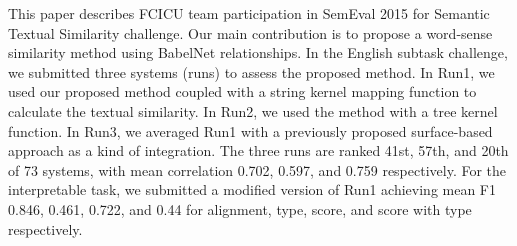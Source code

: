 This paper describes FCICU team participation in SemEval 2015 for Semantic Textual Similarity challenge. Our main contribution is to propose a word-sense similarity method using BabelNet relationships. In the English subtask challenge, we submitted three systems (runs) to assess the proposed method. In Run1, we used our proposed method coupled with a string kernel mapping function to calculate the textual similarity. In Run2, we used the method with a tree kernel function. In Run3, we averaged Run1 with a previously proposed surface-based approach as a kind of integration. The three runs are ranked 41st, 57th, and 20th of 73 systems, with mean correlation 0.702, 0.597, and 0.759 respectively. For the interpretable task, we submitted a modified version of Run1 achieving mean F1 0.846, 0.461, 0.722, and 0.44 for alignment, type, score, and score with type respectively.
